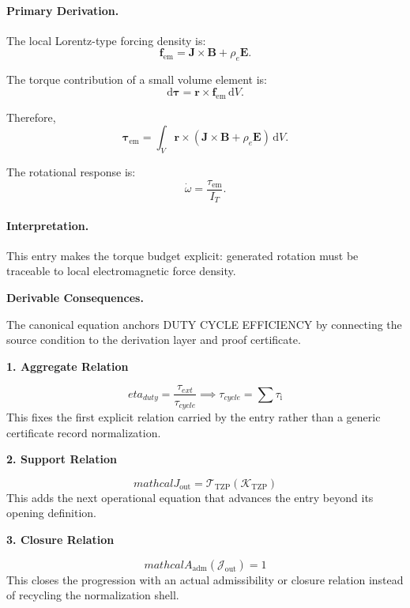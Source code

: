 \paragraph{Primary Derivation.}
The local Lorentz-type forcing density is:
\begin{equation}
\mathbf{f}_{\mathrm{em}}
=
\mathbf{J}\times\mathbf{B}
+
\rho_e\mathbf{E}.
\end{equation}

The torque contribution of a small volume element is:
\begin{equation}
\mathrm{d}\boldsymbol{\tau}
=
\mathbf{r}\times\mathbf{f}_{\mathrm{em}}\,\mathrm{d}V .
\end{equation}

Therefore,
\begin{equation}
\boldsymbol{\tau}_{\mathrm{em}}
=
\int_V
\mathbf{r}\times
\left(
\mathbf{J}\times\mathbf{B}
+
\rho_e\mathbf{E}
\right)
\,\mathrm{d}V .
\end{equation}

The rotational response is:
\begin{equation}
\boxed{
\dot{\omega}
=
\frac{\tau_{\mathrm{em}}}{I_T}.
}
\end{equation}

\paragraph{Interpretation.}
This entry makes the torque budget explicit: generated rotation must be traceable to local electromagnetic force density.

\par\vspace{0.35em}
\noindent\textbf{Derivable Consequences.}\quad
\begingroup
\footnotesize
\raggedright
The canonical equation anchors DUTY CYCLE EFFICIENCY by connecting the source condition to the derivation layer and proof certificate.
\par\endgroup

\noindent\textbf{1. Aggregate Relation}\par
\[
eta_{duty} = \frac{\tau_{ext}}{\tau_{cycle}} \implies \tau_{cycle} = \sum \tau_{\mathrm{i}}
\]
\noindent This fixes the first explicit relation carried by the entry rather than a generic certificate record normalization.\par
\noindent\textbf{2. Support Relation}\par
\[
mathcal{J}_{\mathrm{out}} = \mathcal{T}_{\mathrm{TZP}}\!\left(\mathcal{K}_{\mathrm{TZP}}\right)
\]
\noindent This adds the next operational equation that advances the entry beyond its opening definition.\par
\noindent\textbf{3. Closure Relation}\par
\[
mathcal{A}_{\mathrm{adm}}\!\left(\mathcal{J}_{\mathrm{out}}\right)=1
\]
\noindent This closes the progression with an actual admissibility or closure relation instead of recycling the normalization shell.\par

